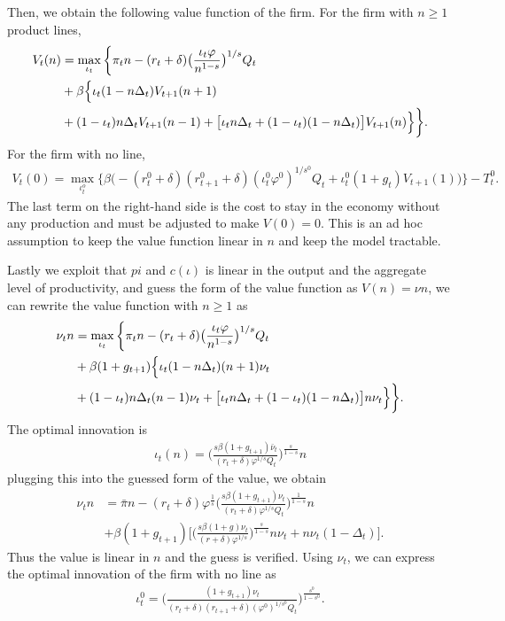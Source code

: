 \documentclass[a4paper,12pt]{article}
\begin{document}
Then, we obtain the following value function of the firm. For the firm with $n\geq 1$ product lines, 
\begin{align}
    V_t(n) &= \max_{\iota_t}\bigg\{ \pi_t n - (r_t+\delta)\big(\frac{\iota_t\varphi}{n^{1-s}}\big)^{1/s} Q_t \notag\\
    &+ \beta \Big\{\iota_t (1-n\Delta_t)V_{t+1}(n+1) \notag\\
    &+ (1-\iota_t)n\Delta_t V_{t+1}(n-1) + \big[\iota_t n\Delta_t+(1-\iota_t)(1-n\Delta_t)\big]V_{t+1}(n) \Big\}
    \bigg\}.
\end{align}
For the firm with no line, 
\begin{align}
    V_t(0) =\max_{\iota_t^o} \bigg\{\beta\Big(-(r^0_t+\delta)(r^0_{t+1}+\delta) (\iota_t^0 \varphi^0)^{1/s^0}Q_t + \iota_t^0(1+g_t)V_{t+1}(1)\Big)\bigg\} - T_t^0.
\end{align}
The last term on the right-hand side is the cost to stay in the economy without any production and must be adjusted to make $V(0) = 0$. This is an ad hoc assumption to keep the value function linear in $n$ and keep the model tractable.\par
Lastly we exploit that $pi$ and $c(\iota)$ is linear in the output and the aggregate level of productivity, and guess the form of the value function as $V(n) = \nu n$, we can rewrite the value function with $n\geq 1$ as
\begin{align}
    \nu_t n &= \max_{\iota_t}\bigg\{ \pi_t n - (r_t+\delta)\big(\frac{\iota_t\varphi}{n^{1-s}}\big)^{1/s} Q_t \notag\\
    &+ \beta (1+g_{t+1}) \Big\{\iota_t (1-n\Delta_t)(n+1)\nu_t \notag\\
    &+ (1-\iota_t)n\Delta_t (n-1) \nu_t + \big[\iota_t n\Delta_t+(1-\iota_t)(1-n\Delta_t)\big]n\nu_t \Big\}
    \bigg\}.
\end{align}
The optimal innovation is 
\begin{align}
    \iota_t(n) = \Big(\frac{s\beta (1+g_{t+1})\bar\nu_t}{(r_t+\delta)\varphi^{1/s}Q_t}\Big)^\frac{s}{1-s}n
\end{align}
plugging this into the guessed form of the value, we obtain
\begin{align}
    \nu_t n &= \bar{\pi}n -(r_t+\delta) \varphi^\frac{1}{s}\Big(\frac{s\beta (1+g_{t+1})\nu_t}{(r_t+\delta)\varphi^{1/s}Q_t}\Big)^\frac{1}{1-s}n \\
    &+\beta (1+g_{t+1}) \bigg[\Big(\frac{s\beta (1+g)\nu_t}{(r+\delta)\varphi^{1/s}}\Big)^\frac{s}{1-s}n \nu_t + n\nu_t(1-\Delta_t)\bigg].
\end{align}
Thus the value is linear in $n$ and the guess is verified. Using $\nu_t$, we can express the optimal innovation of the firm with no line as
\begin{align}
    \iota_t^0 = \Big(\frac{(1+g_{t+1})\nu_t}{(r_t+\delta)(r_{t+1}+\delta)(\varphi^0)^{1/s^0}Q_t}\Big)^\frac{s^0}{1-s^0}.
\end{align}
\end{document}
